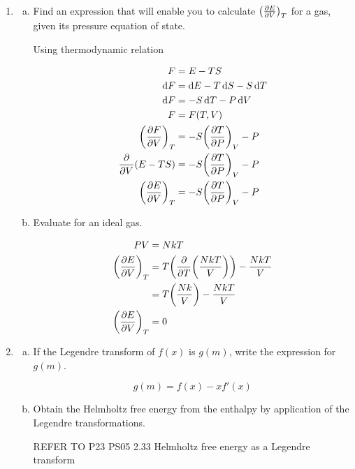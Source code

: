 \documentclass[9pt,a4paper,twocolumn]{article}
\begin{document}
\begin{enumerate}[1.]
\begin{enumerate}[(a)]
	\end{enumerate}
	
	\item
	\begin{enumerate}[(a)]
	
		\item Find an expression that will enable you to calculate $\qty(\pdv{E}{V})_T$ for a gas, given its pressure equation of state.
		
		Using thermodynamic relation
		
		\begin{align}
			F &= E - TS \\
			\dd{F} &= \dd{E} - T\dd{S} - S\dd{T} \\
			\dd{F} &= -S\dd{T} - P\dd{V} \\
			F &= F(T,V) \\
			\qty(\pdv{F}{V})_T &= -S\qty(\pdv{T}{P})_V - P \\
			\pdv{V}(E-TS) &= -S\qty(\pdv{T}{P})_V - P \\
			\qty(\pdv{E}{V})_T &= -S\qty(\pdv{T}{P})_V - P
		\end{align}
		
		\item Evaluate for an ideal gas.
		
		\begin{align}
			PV &= NkT \\
			\qty(\pdv{E}{V})_T &= T\qty(\pdv{T} \qty(\frac{NkT}{V})) - \frac{NkT}{V} \\
			&= T\qty(\frac{Nk}{V}) - \frac{NkT}{V} \\
			\qty(\pdv{E}{V})_T &= 0
		\end{align}
	
	\end{enumerate}
	
	\item
	\begin{enumerate}[(a)]
	
		\item If the Legendre transform of $f(x)$ is $g(m)$, write the expression for $g(m)$.
		
		\begin{equation}
			g(m) = f(x) - xf'(x)
		\end{equation}
		
		\item Obtain the Helmholtz free energy from the enthalpy by application of the Legendre transformations.
		
		REFER TO P23 PS05 2.33 Helmholtz free energy as a Legendre transform
		

\end{enumerate}
\end{enumerate}
\end{document}
